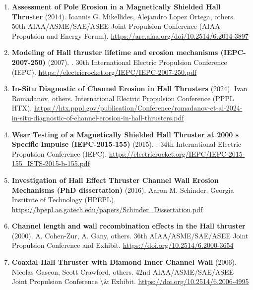 \documentclass[11pt,a4paper]{article}
\begin{document}
\begin{enumerate}[leftmargin=1.4em]
\item \textbf{Assessment of Pole Erosion in a Magnetically Shielded Hall Thruster} (2014). Ioannis G. Mikellides, Alejandro Lopez Ortega, others. 50th AIAA/ASME/SAE/ASEE Joint Propulsion Conference (AIAA Propulsion and Energy Forum). \url{https://arc.aiaa.org/doi/10.2514/6.2014-3897}
\item \textbf{Modeling of Hall thruster lifetime and erosion mechanisms (IEPC-2007-250)} (2007). . 30th International Electric Propulsion Conference (IEPC). \url{https://electricrocket.org/IEPC/IEPC-2007-250.pdf}
\item \textbf{In-Situ Diagnostic of Channel Erosion in Hall Thrusters} (2024). Ivan Romadanov, others. International Electric Propulsion Conference (PPPL HTX). \url{https://htx.pppl.gov/publication/Conference/romadanov-et-al-2024-in-situ-diagnostic-of-channel-erosion-in-hall-thrusters.pdf}
\item \textbf{Wear Testing of a Magnetically Shielded Hall Thruster at 2000 s Specific Impulse (IEPC-2015-155)} (2015). . 34th International Electric Propulsion Conference (IEPC). \url{https://electricrocket.org/IEPC/IEPC-2015-155_ISTS-2015-b-155.pdf}
\item \textbf{Investigation of Hall Effect Thruster Channel Wall Erosion Mechanisms (PhD dissertation)} (2016). Aaron M. Schinder. Georgia Institute of Technology (HPEPL). \url{https://hpepl.ae.gatech.edu/papers/Schinder_Dissertation.pdf}
\item \textbf{Channel length and wall recombination effects in the Hall thruster} (2000). A. Cohen-Zur, A. Gany, others. 36th AIAA/ASME/SAE/ASEE Joint Propulsion Conference and Exhibit. \url{https://doi.org/10.2514/6.2000-3654}
\item \textbf{Coaxial Hall Thruster with Diamond Inner Channel Wall} (2006). Nicolas Gascon, Scott Crawford, others. 42nd AIAA/ASME/SAE/ASEE Joint Propulsion Conference \textbackslash{}\& Exhibit. \url{https://doi.org/10.2514/6.2006-4995}
\end{enumerate}
\end{document}
